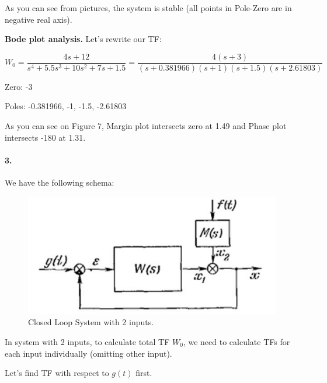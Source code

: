 \documentclass{article}
\begin{document}
        
        As you can see from pictures, the system is stable (all points in Pole-Zero are in negative real axis).
        
        \bigbreak
    
        
        \textbf{Bode plot analysis.}
            \smallbreak
        Let's rewrite our TF:
        
         $$W_0 = \frac{4s + 12}{s^4 + 5.5s^3 + 10s^2 + 7s + 1.5} = \frac{4(s+3)}{(s + 0.381966)(s+1)(s+1.5)(s+2.61803)}$$
        
        Zero: -3
        
        Poles: -0.381966, -1, -1.5, -2.61803
        
        As you can see on Figure 7, Margin plot intersects zero at 1.49 and Phase plot intersects -180 at 1.31.
        
        
        \newpage
        
        \paragraph{3.}
        
        \smallbreak
        
        We have the following schema:
        
        \begin{figure}[hbt!]
            \centering
            \includegraphics[scale=0.2]{hm2_schema.png}
            \caption{Closed Loop System with 2 inputs.}
        \end{figure}
        
        In system with 2 inputs, to calculate total TF $W_0$, we need to calculate TFs for each input individually (omitting other input).
        
        \bigbreak
        
        Let's find TF with respect to $g(t)$ first.
        
\end{document}
